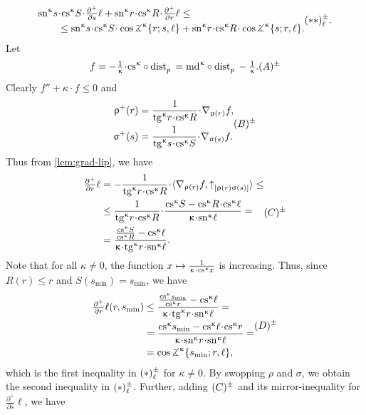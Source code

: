 \[
\begin{aligned}
\sn\kappa s&\cdot\cs\kappa S\cdot\tfrac{\partial^+}{\partial s}\ell
+
\sn\kappa r\cdot\cs\kappa R\cdot\tfrac{\partial^+}{\partial r}\ell\le 
\\
&\le\sn\kappa s\cdot\cs\kappa S\cdot\cos\tangle\mc\kappa\{r;s,\ell\}
+
\sn\kappa r\cdot\cs\kappa R\cdot\cos\tangle\mc\kappa\{s;r,\ell\}.
\end{aligned}
\leqno(**)\mc\pm_\ell.
\]
Let
\[f=-\tfrac{1}{\kappa}\cdot\cs\kappa\circ\distfun{p}{}{}
=
\md\kappa\circ\distfun{p}{}{}-\tfrac{1}{\kappa}.\leqno(A)\mc\pm\]
Clearly $f''+\kappa\cdot  f\le 0$ and
\[
\begin{aligned}
\rho^+(r)&=\frac{1}{\tang\kappa r\cdot\cs\kappa R}\cdot\nabla_{\rho(r)} f,
\\
\sigma^+(s)&=\frac{1}{\tang\kappa s\cdot\cs\kappa S}\cdot\nabla_{\sigma(s)} f.
\end{aligned}
\leqno(B)\mc\pm\]
Thus from \ref{lem:grad-lip}, we have
\[\begin{aligned}
\tfrac{\partial^+}{\partial r}\ell
&=
-\frac{1}{\tang\kappa r\cdot\cs\kappa R}
\cdot
\<\nabla_{\rho(r)} f,\dir{\rho(r)}{\sigma(s)}\>
\le
\\
&\le
\frac
{1}
{\tang\kappa r\cdot\cs\kappa R}
\cdot
\frac
{\cs\kappa S-\cs\kappa R\cdot\cs\kappa\ell}
{\kappa\cdot\sn\kappa\ell}
=
\\
&=
\frac
{\frac{\cs\kappa S}{\cs\kappa R}-\cs\kappa\ell}
{\kappa\cdot\tang\kappa r\cdot\sn\kappa\ell}.
\end{aligned}
\leqno(C)\mc\pm\]
Note that for all $\kappa\ne 0$,
the function $x\mapsto\frac{1}{\kappa\cdot\cs\kappa x}$ is increasing.
Thus, since $R(r)\le r$ and $S(s_{\min})=s_{\min}$, we have 
\[\begin{aligned}
\tfrac{\partial^+}{\partial r}\ell(r,s_{\min})
&\le 
\frac
{\frac{\cs\kappa s_{\min}}{\cs\kappa r}-\cs\kappa\ell}
{\kappa\cdot\tang\kappa r\cdot\sn\kappa\ell}
=
\\
&=
\frac
{{\cs\kappa s_{\min}}-\cs\kappa\ell\cdot\cs\kappa r}
{\kappa\cdot\sn\kappa r\cdot\sn\kappa\ell}=
\\
&=\cos\tangle\mc\kappa\{s_{\min};r,\ell\},
  \end{aligned}\leqno(D)\mc\pm\]
which is the first inequality in $(*)^{\pm}_\ell$ for $\kappa\ne 0$.
By swopping $\rho$ and $\sigma$, we obtain the second inequality in $(*)^{\pm}_\ell$.
Further, adding $(C)^{\pm}$ and its mirror-inequality for $\tfrac{\partial^+}{\partial s}\ell$, we have
